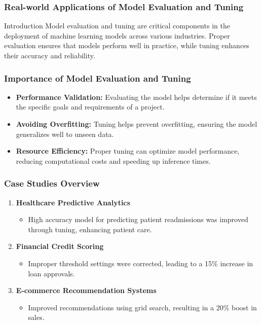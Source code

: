 \documentclass[aspectratio=169]{beamer}
\begin{document}
\begin{frame}[fragile]
    \frametitle{Real-world Applications of Model Evaluation and Tuning}
    \begin{block}{Introduction}
        Model evaluation and tuning are critical components in the deployment of machine learning models across various industries. Proper evaluation ensures that models perform well in practice, while tuning enhances their accuracy and reliability.
    \end{block}
\end{frame}

\begin{frame}[fragile]
    \frametitle{Importance of Model Evaluation and Tuning}
    \begin{itemize}
        \item \textbf{Performance Validation:} Evaluating the model helps determine if it meets the specific goals and requirements of a project.
        \item \textbf{Avoiding Overfitting:} Tuning helps prevent overfitting, ensuring the model generalizes well to unseen data.
        \item \textbf{Resource Efficiency:} Proper tuning can optimize model performance, reducing computational costs and speeding up inference times.
    \end{itemize}
\end{frame}

\begin{frame}[fragile]
    \frametitle{Case Studies Overview}
    \begin{enumerate}
        \item \textbf{Healthcare Predictive Analytics}
            \begin{itemize}
                \item High accuracy model for predicting patient readmissions was improved through tuning, enhancing patient care.
            \end{itemize}
        \item \textbf{Financial Credit Scoring}
            \begin{itemize}
                \item Improper threshold settings were corrected, leading to a 15\% increase in loan approvals.
            \end{itemize}
        \item \textbf{E-commerce Recommendation Systems}
            \begin{itemize}
                \item Improved recommendations using grid search, resulting in a 20\% boost in sales.
            \end{itemize}
    \end{enumerate}
\end{frame}
\end{document}
